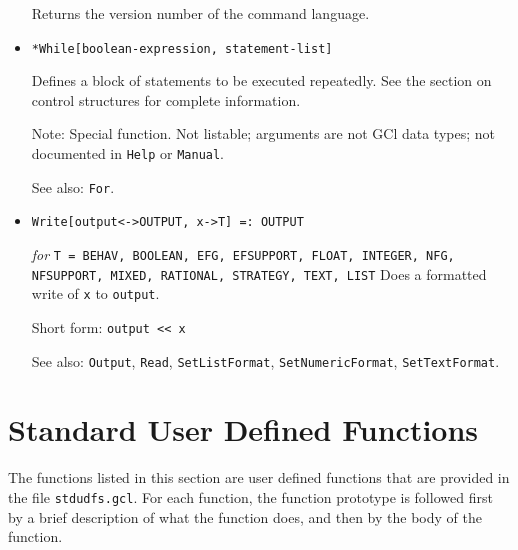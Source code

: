 \begin{itemize}
\bd
Returns the version number of the command language.
\ed


\item{} 
\protect \large \begin{verbatim}
*While[boolean-expression, statement-list]
\end{verbatim} \normalsize
  
\bd
Defines a block of statements to be executed repeatedly.
See the section on control structures for complete information.
\item [Note:] Special function.  Not listable; arguments are not GCl
data types; not documented in \verb+Help+ or \verb+Manual+.  
\item
[See also:] \verb+For+.
\ed

\item{}
\protect \large \begin{verbatim}
Write[output<->OUTPUT, x->T] =: OUTPUT  
\end{verbatim}\normalsize

{\it for} {\tt T = BEHAV, BOOLEAN, EFG, EFSUPPORT, FLOAT, INTEGER,
NFG, NFSUPPORT, MIXED, RATIONAL, STRATEGY, TEXT, LIST}
\bd
Does a formatted write of \verb+x+ to \verb+output+.
\item [Short form:] \verb+output << x+
\item [See also:] \verb+Output+, \verb+Read+, \verb+SetListFormat+,
\verb+SetNumericFormat+, \verb+SetTextFormat+.
\ed




\end{itemize}

\section{Standard User Defined Functions}
\renewcommand{\mysectionname}{\thesection\,\, USER DEFINED FUNCTIONS}

The functions listed in this section are user defined functions that
are provided in the file \verb+stdudfs.gcl+.  For each function, the
function prototype is followed first by a brief description of what
the function does, and then by the body of the function.  

